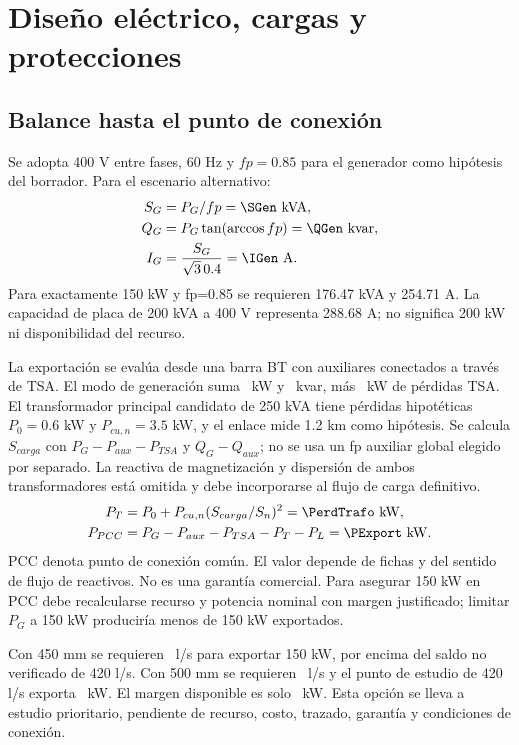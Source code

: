 \chapter{Diseño eléctrico, cargas y protecciones}
\section{Balance hasta el punto de conexión}
Se adopta 400 V entre fases, 60 Hz y $fp=0.85$ para el generador como hipótesis del borrador. Para el escenario alternativo:
\begin{align}
S_G&=P_G/fp=\SGen\ \mathrm{kVA},\\
Q_G&=P_G\tan(\arccos fp)=\QGen\ \mathrm{kvar},\\
I_G&=\frac{S_G}{\sqrt3\,0.4}=\IGen\ \mathrm{A}.
\end{align}
Para exactamente 150 kW y fp=0.85 se requieren 176.47 kVA y 254.71 A. La capacidad de placa de 200 kVA a 400 V representa 288.68 A; no significa 200 kW ni disponibilidad del recurso.

La exportación se evalúa desde una barra BT con auxiliares conectados a través de TSA. El modo de generación suma \PAuxNormal\ kW y \QAuxNormal\ kvar, más \PerdTsa\ kW de pérdidas TSA. El transformador principal candidato de 250 kVA tiene pérdidas hipotéticas $P_0=0.6$ kW y $P_{cu,n}=3.5$ kW, y el enlace mide 1.2 km como hipótesis. Se calcula $S_{carga}$ con $P_G-P_{aux}-P_{TSA}$ y $Q_G-Q_{aux}$; no se usa un fp auxiliar global elegido por separado. La reactiva de magnetización y dispersión de ambos transformadores está omitida y debe incorporarse al flujo de carga definitivo.
\begin{align}
P_T&=P_0+P_{cu,n}(S_{carga}/S_n)^2=\PerdTrafo\ \mathrm{kW},\\
P_{PCC}&=P_G-P_{aux}-P_{TSA}-P_T-P_L=\PExport\ \mathrm{kW}.
\end{align}
PCC denota punto de conexión común. El valor depende de fichas y del sentido de flujo de reactivos. No es una garantía comercial. Para asegurar 150 kW en PCC debe recalcularse recurso y potencia nominal con margen justificado; limitar $P_G$ a 150 kW produciría menos de 150 kW exportados.

Con 450 mm se requieren \QObjetivoRef\ l/s para exportar 150 kW, por encima del saldo no verificado de 420 l/s. Con 500 mm se requieren \QObjetivo\ l/s y el punto de estudio de 420 l/s exporta \PExport\ kW. El margen disponible es solo \MargenExport\ kW. Esta opción se lleva a estudio prioritario, pendiente de recurso, costo, trazado, garantía y condiciones de conexión.

